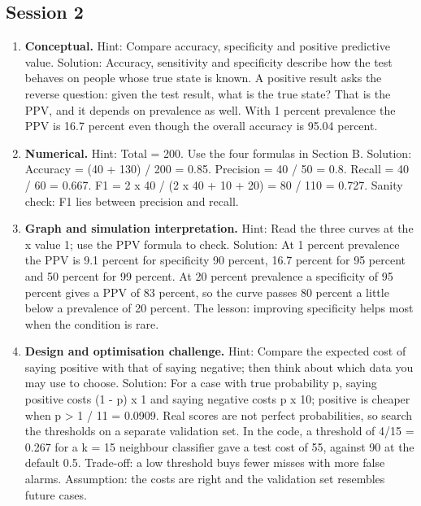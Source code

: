 \documentclass[11pt,a4paper]{article}
\begin{document}
\subsection*{Session 2}
\begin{enumerate}[nosep]
\item \textbf{Conceptual.} Hint: Compare accuracy, specificity and positive predictive value. Solution: Accuracy, sensitivity and specificity describe how the test behaves on people whose true state is known. A positive result asks the reverse question: given the test result, what is the true state? That is the PPV, and it depends on prevalence as well. With 1 percent prevalence the PPV is 16.7 percent even though the overall accuracy is 95.04 percent.
\item \textbf{Numerical.} Hint: Total = 200. Use the four formulas in Section B. Solution: Accuracy = (40 + 130) / 200 = 0.85. Precision = 40 / 50 = 0.8. Recall = 40 / 60 = 0.667. F1 = 2 x 40 / (2 x 40 + 10 + 20) = 80 / 110 = 0.727. Sanity check: F1 lies between precision and recall.
\item \textbf{Graph and simulation interpretation.} Hint: Read the three curves at the x value 1; use the PPV formula to check. Solution: At 1 percent prevalence the PPV is 9.1 percent for specificity 90 percent, 16.7 percent for 95 percent and 50 percent for 99 percent. At 20 percent prevalence a specificity of 95 percent gives a PPV of 83 percent, so the curve passes 80 percent a little below a prevalence of 20 percent. The lesson: improving specificity helps most when the condition is rare.
\item \textbf{Design and optimisation challenge.} Hint: Compare the expected cost of saying positive with that of saying negative; then think about which data you may use to choose. Solution: For a case with true probability p, saying positive costs (1 - p) x 1 and saying negative costs p x 10; positive is cheaper when p \textgreater{} 1 / 11 = 0.0909. Real scores are not perfect probabilities, so search the thresholds on a separate validation set. In the code, a threshold of 4/15 = 0.267 for a k = 15 neighbour classifier gave a test cost of 55, against 90 at the default 0.5. Trade-off: a low threshold buys fewer misses with more false alarms. Assumption: the costs are right and the validation set resembles future cases.
\end{enumerate}
\end{document}
